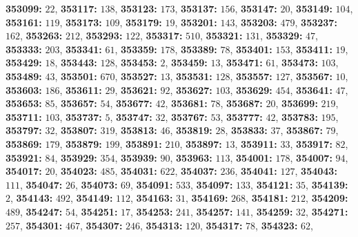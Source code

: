 \textsf{\bfseries 353099:} $22$, \textsf{\bfseries 353117:} $138$, \textsf{\bfseries 353123:} $173$, \textsf{\bfseries 353137:} $156$, \textsf{\bfseries 353147:} $20$, \textsf{\bfseries 353149:} $104$, \textsf{\bfseries 353161:} $119$, \textsf{\bfseries 353173:} $109$, \textsf{\bfseries 353179:} $19$, \textsf{\bfseries 353201:} $143$, \textsf{\bfseries 353203:} $479$, \textsf{\bfseries 353237:} $162$, \textsf{\bfseries 353263:} $212$, \textsf{\bfseries 353293:} $122$, \textsf{\bfseries 353317:} $510$, \textsf{\bfseries 353321:} $131$, \textsf{\bfseries 353329:} $47$, \textsf{\bfseries 353333:} $203$, \textsf{\bfseries 353341:} $61$, \textsf{\bfseries 353359:} $178$, \textsf{\bfseries 353389:} $78$, \textsf{\bfseries 353401:} $153$, \textsf{\bfseries 353411:} $19$, \textsf{\bfseries 353429:} $18$, \textsf{\bfseries 353443:} $128$, \textsf{\bfseries 353453:} $2$, \textsf{\bfseries 353459:} $13$, \textsf{\bfseries 353471:} $61$, \textsf{\bfseries 353473:} $103$, \textsf{\bfseries 353489:} $43$, \textsf{\bfseries 353501:} $670$, \textsf{\bfseries 353527:} $13$, \textsf{\bfseries 353531:} $128$, \textsf{\bfseries 353557:} $127$, \textsf{\bfseries 353567:} $10$, \textsf{\bfseries 353603:} $186$, \textsf{\bfseries 353611:} $29$, \textsf{\bfseries 353621:} $92$, \textsf{\bfseries 353627:} $103$, \textsf{\bfseries 353629:} $454$, \textsf{\bfseries 353641:} $47$, \textsf{\bfseries 353653:} $85$, \textsf{\bfseries 353657:} $54$, \textsf{\bfseries 353677:} $42$, \textsf{\bfseries 353681:} $78$, \textsf{\bfseries 353687:} $20$, \textsf{\bfseries 353699:} $219$, \textsf{\bfseries 353711:} $103$, \textsf{\bfseries 353737:} $5$, \textsf{\bfseries 353747:} $32$, \textsf{\bfseries 353767:} $53$, \textsf{\bfseries 353777:} $42$, \textsf{\bfseries 353783:} $195$, \textsf{\bfseries 353797:} $32$, \textsf{\bfseries 353807:} $319$, \textsf{\bfseries 353813:} $46$, \textsf{\bfseries 353819:} $28$, \textsf{\bfseries 353833:} $37$, \textsf{\bfseries 353867:} $79$, \textsf{\bfseries 353869:} $179$, \textsf{\bfseries 353879:} $199$, \textsf{\bfseries 353891:} $210$, \textsf{\bfseries 353897:} $13$, \textsf{\bfseries 353911:} $33$, \textsf{\bfseries 353917:} $82$, \textsf{\bfseries 353921:} $84$, \textsf{\bfseries 353929:} $354$, \textsf{\bfseries 353939:} $90$, \textsf{\bfseries 353963:} $113$, \textsf{\bfseries 354001:} $178$, \textsf{\bfseries 354007:} $94$, \textsf{\bfseries 354017:} $20$, \textsf{\bfseries 354023:} $485$, \textsf{\bfseries 354031:} $622$, \textsf{\bfseries 354037:} $236$, \textsf{\bfseries 354041:} $127$, \textsf{\bfseries 354043:} $111$, \textsf{\bfseries 354047:} $26$, \textsf{\bfseries 354073:} $69$, \textsf{\bfseries 354091:} $533$, \textsf{\bfseries 354097:} $133$, \textsf{\bfseries 354121:} $35$, \textsf{\bfseries 354139:} $2$, \textsf{\bfseries 354143:} $492$, \textsf{\bfseries 354149:} $112$, \textsf{\bfseries 354163:} $31$, \textsf{\bfseries 354169:} $268$, \textsf{\bfseries 354181:} $212$, \textsf{\bfseries 354209:} $489$, \textsf{\bfseries 354247:} $54$, \textsf{\bfseries 354251:} $17$, \textsf{\bfseries 354253:} $241$, \textsf{\bfseries 354257:} $141$, \textsf{\bfseries 354259:} $32$, \textsf{\bfseries 354271:} $257$, \textsf{\bfseries 354301:} $467$, \textsf{\bfseries 354307:} $246$, \textsf{\bfseries 354313:} $120$, \textsf{\bfseries 354317:} $78$, \textsf{\bfseries 354323:} $62$, 
